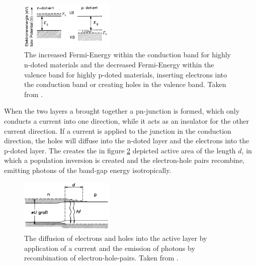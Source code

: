             \begin{figure}[h]
                \centering
                \includegraphics[width = 0.4\textwidth]{pictures/pn_doted.png}
                \caption{The increased Fermi-Energy within the conduction band for highly n-doted materials and the decreased Fermi-Energy within the valence band for highly p-doted materials, inserting electrons into the conduction band or creating holes in the valence band. Taken from \cite{eichler_laser_2015}.}
                \label{fig:pn_doted}
             \end{figure}
         
             \FloatBarrier
         
            When the two layers a brought together a pn-junction is formed, which only conducts a current into one direction, while it acts as an insulator for the other current direction. If a current is applied
            to the junction in the conduction direction, the holes will diffuse into the n-doted layer and the electrons into the p-doted layer. The creates the in figure \ref{fig:eh_diffusion} depicted active 
            area of the length $d$, in which a population inversion is created and the electron-hole pairs recombine, emitting photons of the band-gap energy isotropically.   
         
            \begin{figure}[h]
                \centering
                \includegraphics[width = 0.4\textwidth]{pictures/eh_diffusion.jpg}
                \caption{The diffusion of electrons and holes into the active layer by application of a current and the emission of photons by recombination of electron-hole-pairs. Taken from \cite{tu_dortmund_versuchsanleitung_2022-1}.}
                \label{fig:eh_diffusion}
            \end{figure}
        
